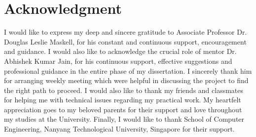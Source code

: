 \chapter*{Acknowledgment} 
\label{ch0_Acknowledgement}
I would like to express my deep and sincere gratitude to Associate Professor Dr. Douglas Leslie Maskell, for his constant and continuous support, encouragement and guidance. I would also like to acknowledge the crucial role of mentor Dr. Abhishek Kumar Jain, for his continuous support, effective suggestions and professional guidance in the entire phase of my dissertation. I sincerely thank him for arranging weekly meeting which were helpful in discussing the project to find the right path to proceed. I would also like to thank my friends and classmates for helping me with technical issues regarding my practical work. My heartfelt appreciation goes to my beloved parents for their support and love throughout my studies at the University. Finally, I would like to thank School of Computer Engineering, Nanyang Technological University, Singapore for their support.